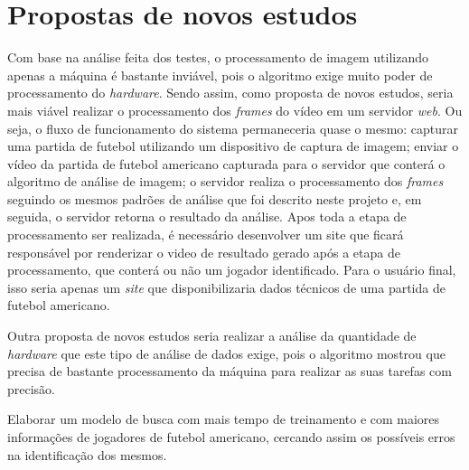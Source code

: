 \section{\textbf{Propostas de novos estudos}}
\label{novos_estudos}

Com base na análise feita dos testes, o processamento de imagem utilizando apenas a máquina é bastante inviável, pois o algoritmo exige muito poder de processamento do \textit{hardware}. Sendo assim, como proposta de novos estudos, seria mais viável realizar o processamento dos \textit{frames} do vídeo em um servidor \textit{web}. Ou seja,  o fluxo de funcionamento do sistema permaneceria quase o mesmo: capturar uma partida de futebol utilizando um dispositivo de captura de imagem; enviar o vídeo da partida de futebol americano capturada para o servidor que conterá o algoritmo de análise de imagem; o servidor realiza o processamento dos \textit{frames} seguindo os mesmos padrões de análise que foi descrito neste projeto e, em seguida, o servidor retorna o resultado da análise. Apos toda a etapa de processamento ser realizada, é necessário desenvolver um site que ficará responsável por renderizar o video de resultado gerado após a etapa de processamento, que conterá ou não um jogador identificado. Para o usuário final, isso seria apenas um \textit{site} que disponibilizaria dados técnicos de uma partida de futebol americano.

Outra proposta de novos estudos seria realizar a análise da quantidade de \textit{hardware} que este tipo de análise de dados exige, pois o algoritmo mostrou que precisa de bastante processamento da máquina para realizar as suas tarefas com precisão.

Elaborar um modelo de busca com mais tempo de treinamento e com maiores informações de jogadores de futebol americano, cercando assim os possíveis erros na identificação dos mesmos.